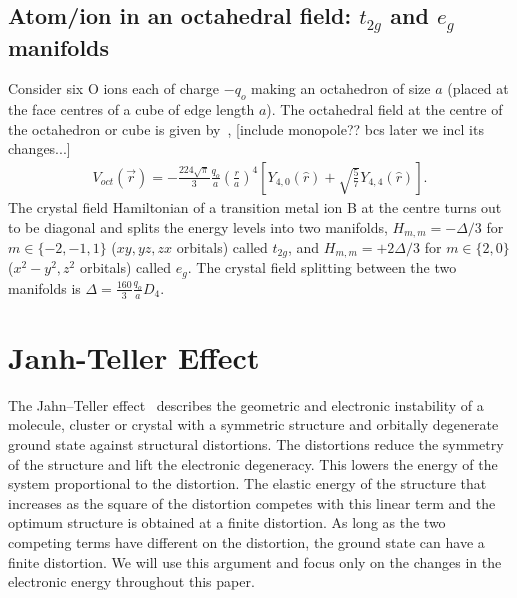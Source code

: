 \documentclass[a4paper,prb]{revtex4-1}  %
\newcommand{\com}[1]{}
\newcommand{\az}[1]{{\color{magenta}{#1}}} %
\newcommand{\ylm}[1]{Y_{#1}(\hat r)}
\begin{document}
\subsection{Atom/ion in an octahedral field: $t_{2g}$  and $e_g$ manifolds}
\label{sec:egt2g}
Consider six O ions each of charge $-q_o$ making an octahedron of size $a$ (placed at the face centres of a cube of edge length $a$).
The octahedral field at the centre of the octahedron or cube  
is given by~\cite{pavariniChap}, [include monopole?? bcs later we incl its changes...]
\begin{align}
\label{eq:voct}
V_{oct}(\vec r) = -\frac{224\sqrt{\pi}}{3}\frac{q_o}{a} \left(\frac{r}{a}\right)^4\left[\ylm{4,0}+\sqrt{\frac{5}{7}}\ylm{4,4} \right].
\end{align}
The crystal field Hamiltonian of a transition metal ion B at the centre 
turns out to be diagonal
and splits the energy levels into two manifolds,
$H_{m,m} = -\Delta/3$ for $m\in\{-2,-1,1\}$ ($xy,yz,zx$ orbitals)
called $t_{2g}$,
and 
$H_{m,m} = +2\Delta/3$ for $m\in\{2,0\}$ ($x^2-y^2,z^2$ orbitals)
called $e_g$.
The crystal field splitting between the two manifolds is
${\Delta=\frac{160}{3}\frac{q_o}{a} D_{4}}$.


\com{
$V_{oct}(\vec r)$ causes the d-orbitals to split into two manifolds,
$t_{2g}$  and $e_g$, where $t_{2g}$ contains three degenerate states ($xy,yz,zx$) while $e_g$ has two degenerate states ($x^2-y^2,z^2$).
The crystal field splitting between the two manifolds is
${\Delta=\frac{160}{3}\frac{q_o}{a} D_{4}}$.
\az{We will see how these degeneracies are lifted as we elongate (or compress)
the octahedron along a ....??}
}


\section{Janh-Teller Effect}

The Jahn--Teller effect~\cite{Jahn-Teller} describes the 
geometric and electronic instability of a %
molecule, cluster or crystal with
a symmetric structure and orbitally degenerate ground state
against structural distortions.
The distortions  
reduce the symmetry of the structure
and lift the electronic degeneracy.
This lowers the energy of the system proportional to
the distortion.
The elastic energy of the structure that increases as the square of the distortion
competes with this linear term and the optimum structure 
is obtained at a finite distortion.
As long as the two competing terms have different \az{[dependence, exponent? diff order polynomial?]} on the distortion,
the ground state can have a finite distortion.
We will use this argument and focus only on the changes
 in the electronic energy throughout this paper.
\end{document}
